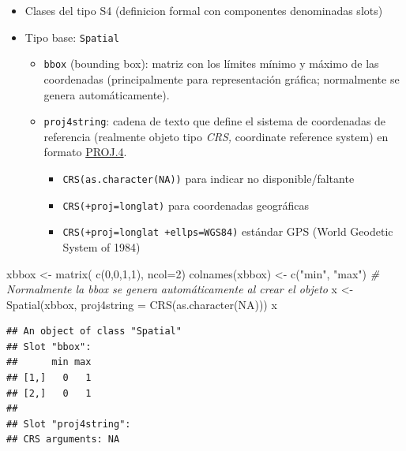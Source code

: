 \documentclass[
  spanish,
]{book}
\newenvironment{Shaded}{\begin{snugshade}}{\end{snugshade}}
\newcommand{\AttributeTok}[1]{\textcolor[rgb]{0.77,0.63,0.00}{#1}}
\newcommand{\CommentTok}[1]{\textcolor[rgb]{0.56,0.35,0.01}{\textit{#1}}}
\newcommand{\ConstantTok}[1]{\textcolor[rgb]{0.00,0.00,0.00}{#1}}
\newcommand{\DecValTok}[1]{\textcolor[rgb]{0.00,0.00,0.81}{#1}}
\newcommand{\FunctionTok}[1]{\textcolor[rgb]{0.00,0.00,0.00}{#1}}
\newcommand{\NormalTok}[1]{#1}
\newcommand{\OtherTok}[1]{\textcolor[rgb]{0.56,0.35,0.01}{#1}}
\newcommand{\StringTok}[1]{\textcolor[rgb]{0.31,0.60,0.02}{#1}}
\theoremstyle{break}
\theoremstyle{definition}
\theoremstyle{definition}
\theoremstyle{definition}
\theoremstyle{definition}
\theoremstyle{remark}
\begin{document}
\begin{itemize}
\item
  Clases del tipo S4 (definicion formal con componentes
  denominadas slots)
\item
  Tipo base: \texttt{Spatial}

  \begin{itemize}
  \item
    \texttt{bbox} (bounding box): matriz con los límites mínimo y máximo de
    las coordenadas (principalmente para representación gráfica;
    normalmente se genera automáticamente).
  \item
    \texttt{proj4string}: cadena de texto que define el sistema de
    coordenadas de referencia (realmente objeto tipo \emph{CRS,}
    coordinate reference system) en formato
    \href{http://trac.osgeo.org/proj}{PROJ.4}.

    \begin{itemize}
    \item
      \texttt{CRS(as.character(NA))} para indicar no disponible/faltante
    \item
      \texttt{CRS(+proj=longlat)} para coordenadas geográficas
    \item
      \texttt{CRS(+proj=longlat\ +ellps=WGS84)} estándar GPS (World
      Geodetic System of 1984)
    \end{itemize}
  \end{itemize}
\end{itemize}

\begin{Shaded}
\begin{Highlighting}[]
\NormalTok{xbbox }\OtherTok{\textless{}{-}} \FunctionTok{matrix}\NormalTok{( }\FunctionTok{c}\NormalTok{(}\DecValTok{0}\NormalTok{,}\DecValTok{0}\NormalTok{,}\DecValTok{1}\NormalTok{,}\DecValTok{1}\NormalTok{), }\AttributeTok{ncol=}\DecValTok{2}\NormalTok{)}
\FunctionTok{colnames}\NormalTok{(xbbox) }\OtherTok{\textless{}{-}} \FunctionTok{c}\NormalTok{(}\StringTok{"min"}\NormalTok{, }\StringTok{"max"}\NormalTok{) }\CommentTok{\# Normalmente la bbox se genera automáticamente al crear el objeto}
\NormalTok{x }\OtherTok{\textless{}{-}} \FunctionTok{Spatial}\NormalTok{(xbbox, }\AttributeTok{proj4string =} \FunctionTok{CRS}\NormalTok{(}\FunctionTok{as.character}\NormalTok{(}\ConstantTok{NA}\NormalTok{)))}
\NormalTok{x}
\end{Highlighting}
\end{Shaded}

\begin{verbatim}
## An object of class "Spatial"
## Slot "bbox":
##      min max
## [1,]   0   1
## [2,]   0   1
## 
## Slot "proj4string":
## CRS arguments: NA
\end{verbatim}
\end{document}
